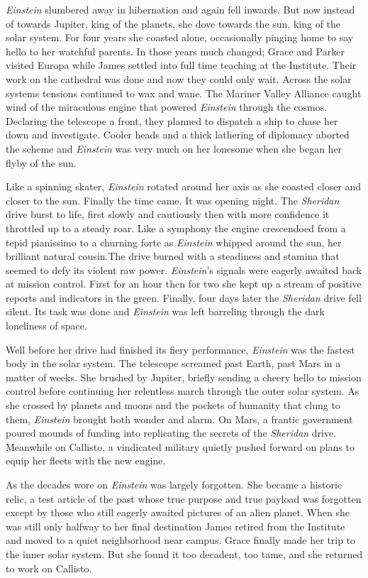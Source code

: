 \documentclass[12pt]{article} %
\begin{document}
\textit{Einstein} slumbered away in hibernation and again fell inwards. But now instead of towards Jupiter, king of the planets, she dove towards the sun, king of the solar system. For four years she coasted alone, occasionally pinging home to say hello to her watchful parents. In those years much changed; Grace and Parker visited Europa while James settled into full time teaching at the Institute. Their work on the cathedral was done and now they could only wait. Across the solar systems tensions continued to wax and wane. The Mariner Valley Alliance caught wind of the miraculous engine that powered \textit{Einstein} through the cosmos. Declaring the telescope a front, they planned to dispatch a ship to chase her down and investigate. Cooler heads and a thick lathering of diplomacy aborted the scheme and \textit{Einstein} was very much on her lonesome when she began her flyby of the sun.

Like a spinning skater, \textit{Einstein} rotated around her axis as she coasted closer and closer to the sun. Finally the time came. It was opening night. The \textit{Sheridan} drive burst to life, first slowly and cautiously then with more confidence it throttled up to a steady roar. Like a symphony the engine crescendoed from a tepid pianissimo to a churning forte as \textit{Einstein} whipped around the sun, her brilliant natural cousin.The drive burned with a steadiness and stamina that seemed to defy its violent raw power. \textit{Einstein}'s signals were eagerly awaited back at mission control. First for an hour then for two she kept up a stream of positive reports and indicators in the green. Finally, four days later the \textit{Sheridan} drive fell silent. Its task was done and \textit{Einstein} was left barreling through the dark loneliness of space.

Well before her drive had finished its fiery performance, \textit{Einstein} was the fastest body in the solar system. The telescope screamed past Earth, past Mars in a matter of weeks. She brushed by Jupiter, briefly sending a cheery hello to mission control before continuing her relentless march through the outer solar system. As she crossed by planets and moons and the pockets of humanity that clung to them, \textit{Einstein} brought both wonder and alarm. On Mars, a frantic government poured mounds of funding into replicating the secrets of the \textit{Sheridan} drive. Meanwhile on Callisto, a vindicated military quietly pushed forward on plans to equip her fleets with the new engine.

As the decades wore on \textit{Einstein} was largely forgotten. She became a historic relic, a test article of the past whose true purpose and true payload was forgotten except by those who still eagerly awaited pictures of an alien planet. When she was still only halfway to her final destination James retired from the Institute and moved to a quiet neighborhood near campus. Grace finally made her trip to the inner solar system. But she found it too decadent, too tame, and she returned to work on Callisto.
\end{document}

